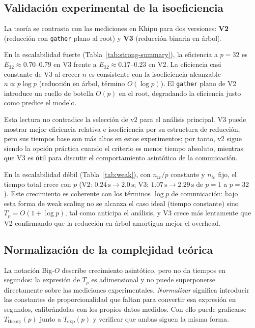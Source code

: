 \documentclass[11pt,a4paper]{article}
\begin{document}
\subsection{Validación experimental de la isoeficiencia}

La teoría se contrasta con las mediciones en Khipu para dos versiones: \textbf{V2} (reducción con
\texttt{gather} plano al root) y \textbf{V3} (reducción binaria en árbol).



En la escalabilidad fuerte (Tabla~\ref{tab:strong-summary}), la eficiencia a $p=32$ es
$E_{32}\approx 0.70$–$0.79$ en V3 frente a $E_{32}\approx 0.17$–$0.23$ en V2. La eficiencia casi
constante de V3 al crecer $n$ es consistente con la isoeficiencia alcanzable $n\propto p\log p$
(reducción en árbol, término $O(\log p)$). El \texttt{gather} plano de V2 introduce un cuello de
botella $O(p)$ en el root, degradando la eficiencia justo como predice el modelo.

Esta lectura no contradice la selección de v2 para el análisis principal. V3 puede mostrar mejor
eficiencia relativa e isoeficiencia por su estructura de reducción, pero sus tiempos base son más
altos en estos experimentos; por tanto, v2 sigue siendo la opción práctica cuando el criterio es
menor tiempo absoluto, mientras que V3 es útil para discutir el comportamiento asintótico de la
comunicación.



En la escalabilidad débil (Tabla~\ref{tab:weak}), con $n_{tr}/p$ constante y $n_{te}$ fijo, el
tiempo total crece con $p$ (V2: $0.24\,\text{s}\to 2.0\,\text{s}$; V3: $1.07\,\text{s}\to
2.29\,\text{s}$ de $p{=}1$ a $p{=}32$). Este crecimiento es coherente con los términos $\log p$ de
comunicación: bajo esta forma de weak scaling no se alcanza el caso ideal (tiempo constante) sino
$T_p=O(1+\log p)$, tal como anticipa el análisis, y V3 crece más lentamente que V2 confirmando que
la reducción en árbol amortigua mejor el overhead.

\subsection{Normalización de la complejidad teórica}\label{sec:normalizacion}

La notación Big-$O$ describe crecimiento asintótico, pero no da tiempos en segundos: la expresión
de $T_p$ es adimensional y no puede superponerse directamente sobre las mediciones experimentales.
\emph{Normalizar} significa introducir las constantes de proporcionalidad que faltan para convertir
esa expresión en segundos, calibrándolas con los propios datos medidos. Con ello puede graficarse
$T_{\text{theory}}(p)$ junto a $T_{\text{exp}}(p)$ y verificar que ambas siguen la misma forma.
\end{document}
